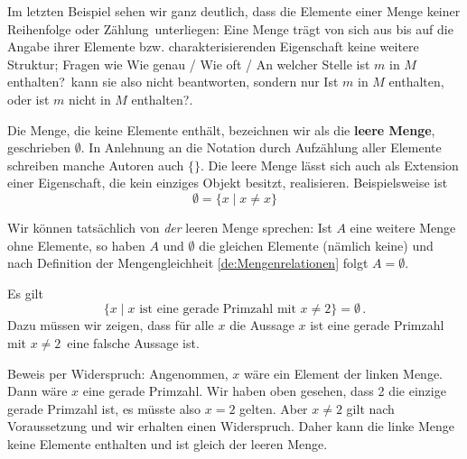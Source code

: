 \begin{bem}\label{mengen:strukturlos}
	Im letzten Beispiel sehen wir ganz deutlich, dass die Elemente einer Menge keiner Reihenfolge oder \glqq Zählung\grqq\ unterliegen: Eine Menge trägt von sich aus bis auf die Angabe ihrer Elemente bzw. charakterisierenden Eigenschaft keine weitere Struktur; Fragen wie \glqq Wie genau / Wie oft / An welcher Stelle ist $m$ in $M$ enthalten?\grqq\ kann sie also nicht beantworten, sondern nur \glqq Ist $m$ in $M$ enthalten, oder ist $m$ nicht in $M$ enthalten?\grqq .
\end{bem}




\begin{de}
	Die Menge, die keine Elemente enthält, bezeichnen wir als die \textbf{leere Menge}, geschrieben $\emptyset$. In Anlehnung an die Notation durch Aufzählung aller Elemente schreiben manche Autoren auch $\{\}$. Die leere Menge lässt sich auch als Extension einer Eigenschaft, die kein einziges Objekt besitzt, realisieren. Beispielsweise ist
		\[ \emptyset = \{ x \mid x\neq x\} \]
\end{de}

\begin{bem}
	Wir können tatsächlich von \textit{der} leeren Menge sprechen: Ist $A$ eine weitere Menge ohne Elemente, so haben $A$ und $\emptyset$ die gleichen Elemente (nämlich keine) und nach Definition der Mengengleichheit \cref{de:Mengenrelationen} folgt $A=\emptyset$.
\end{bem}

\begin{bsp}
	Es gilt
		\[ \{ x \mid x \text{ ist eine gerade Primzahl mit } x\neq 2 \} = \emptyset \,. \]
	Dazu müssen wir zeigen, dass für alle $x$ die Aussage \glqq$x$ ist eine gerade Primzahl mit $x\neq 2$\grqq\, eine falsche Aussage ist.
	
	Beweis per Widerspruch: Angenommen, $x$ wäre ein Element der linken Menge. Dann wäre $x$ eine gerade Primzahl. Wir haben oben gesehen, dass 2 die einzige gerade Primzahl ist, es müsste also $x=2$ gelten. Aber $x\neq2$ gilt nach Voraussetzung und wir erhalten einen Widerspruch. Daher kann die linke Menge keine Elemente enthalten und ist gleich der leeren Menge. 
\end{bsp}

